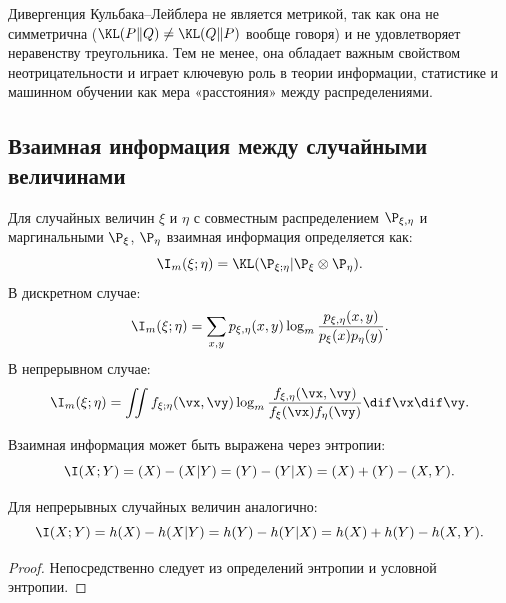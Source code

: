 \begin{remark}
	Дивергенция Кульбака–Лейблера не является метрикой, так как она не симметрична ($\KL(P\|Q) \neq \KL(Q\|P)$ вообще говоря) и не удовлетворяет неравенству треугольника. Тем не менее, она обладает важным свойством неотрицательности и играет ключевую роль в теории информации, статистике и машинном обучении как мера «расстояния» между распределениями.
\end{remark}

\subsection{Взаимная информация между случайными величинами}

\begin{definition}
	Для случайных величин $\xi$ и $\eta$ с совместным распределением $\P_{\xi, \eta}$ и маргинальными $\P_{\xi}$, $\P_{\eta}$ взаимная информация определяется как:
	\[
		\I_m(\xi;\eta) = \KL(\P_{\xi; \eta} | \P_\xi \otimes \P_{\eta}).
	\]
	В дискретном случае:
	\[
		\I_m(\xi;\eta) = \sum_{x,y} p_{\xi, \eta}(x,y) \log_m \frac{p_{\xi, \eta}(x,y)}{p_{\xi}(x)p_{\eta}(y)}.
	\]
	В непрерывном случае:
	\[
		\I_m(\xi;\eta) = \iint f_{\xi; \eta}(\vx,\vy) \log_m \frac{f_{\xi, \eta}(\vx,\vy)}{f_{\xi}(\vx)f_{\eta}(\vy)} \dif\vx\dif\vy.
	\]
\end{definition}

\begin{proposition}
	Взаимная информация может быть выражена через энтропии:
	\[
		\I(X;Y) = \H(X) - \H(X|Y) = \H(Y) - \H(Y|X) = \H(X) + \H(Y) - \H(X,Y).
	\]
	
	Для непрерывных случайных величин аналогично:
	\[
		\I(X;Y) = h(X) - h(X|Y) = h(Y) - h(Y|X) = h(X) + h(Y) - h(X,Y).
	\]
\end{proposition}

\begin{proof}
	Непосредственно следует из определений энтропии и условной энтропии.
\end{proof}



